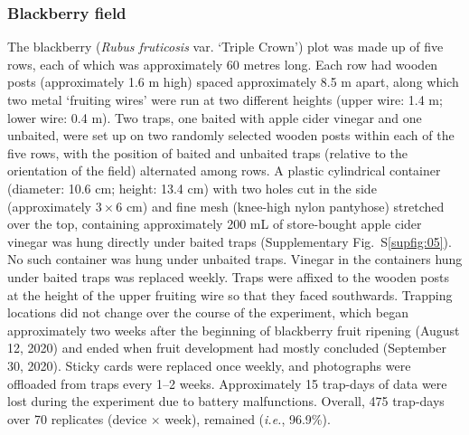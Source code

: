 \documentclass[fleqn,10pt]{wlscirep}
\begin{document}
\subsubsection*{Blackberry field}
The blackberry (\emph{Rubus fruticosis} var. ‘Triple Crown’) plot was made up of five rows, each of which was approximately 60 metres long. Each row had wooden posts (approximately 1.6 m high) spaced approximately 8.5 m apart, along which two metal ‘fruiting wires’ were run at two different heights (upper wire: 1.4 m; lower wire: 0.4 m). Two traps, one baited with apple cider vinegar and one unbaited, were set up on two randomly selected wooden posts within each of the five rows, with the position of baited and unbaited traps (relative to the orientation of the field) alternated among rows. A plastic cylindrical container (diameter: 10.6 cm; height: 13.4 cm) with two holes cut in the side (approximately $3 \times{} 6$ cm) and fine mesh (knee-high nylon pantyhose) stretched over the top, containing approximately 200 mL of store-bought apple cider vinegar was hung directly under baited traps
(Supplementary Fig.~S\ref{supfig:05}). No such container was hung under unbaited traps. Vinegar in the containers hung under baited traps was replaced weekly. Traps were affixed to the wooden posts at the height of the upper fruiting wire so that they faced southwards. Trapping locations did not change over the course of the experiment, which began approximately two weeks after the beginning of blackberry fruit ripening (August 12, 2020) and ended when fruit development had mostly concluded (September 30, 2020). Sticky cards were replaced once weekly, and photographs were offloaded from traps every 1–2 weeks. Approximately 15 trap-days of data were lost during the experiment due to battery malfunctions. Overall, 475 trap-days over 70 replicates (device $\times{}$ week), remained (\emph{i.e.}, 96.9\%).
\end{document}
